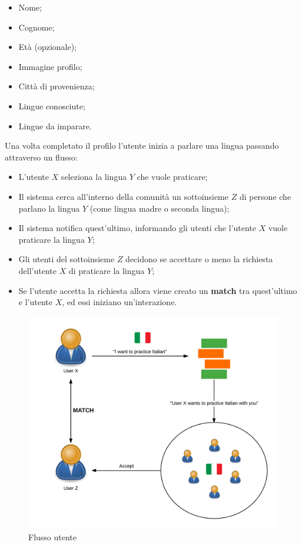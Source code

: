 \begin{itemize}

\item Nome;
\item Cognome;
\item Età (opzionale);
\item Immagine profilo;
\item Città di provenienza;
\item Lingue conosciute;
\item Lingue da imparare.

\end{itemize}

Una volta completato il profilo l'utente inizia a parlare una lingua passando attraverso un flusso:

\begin{itemize}

\item L'utente $X$ seleziona la lingua $Y$ che vuole praticare;
\item Il sistema cerca all'interno della comunità un sottoinsieme $Z$ di persone che parlano la lingua $Y$ (come lingua madre o seconda lingua);
\item Il sistema notifica quest'ultimo, informando gli utenti che l'utente $X$ vuole praticare la lingua $Y$;
\item Gli utenti del sottoinsieme $Z$ decidono se accettare o meno la richiesta dell'utente $X$ di praticare la lingua $Y$;
\item Se l'utente accetta la richiesta allora viene creato un \textbf{match} tra quest'ultimo e l'utente $X$, ed essi iniziano un'interazione.

\end{itemize}

\begin{figure}[htpd]
\centering
\includegraphics[width=\textwidth]{../immagini/coffeestrap-flow}
\caption{Flusso utente}
\end{figure}

